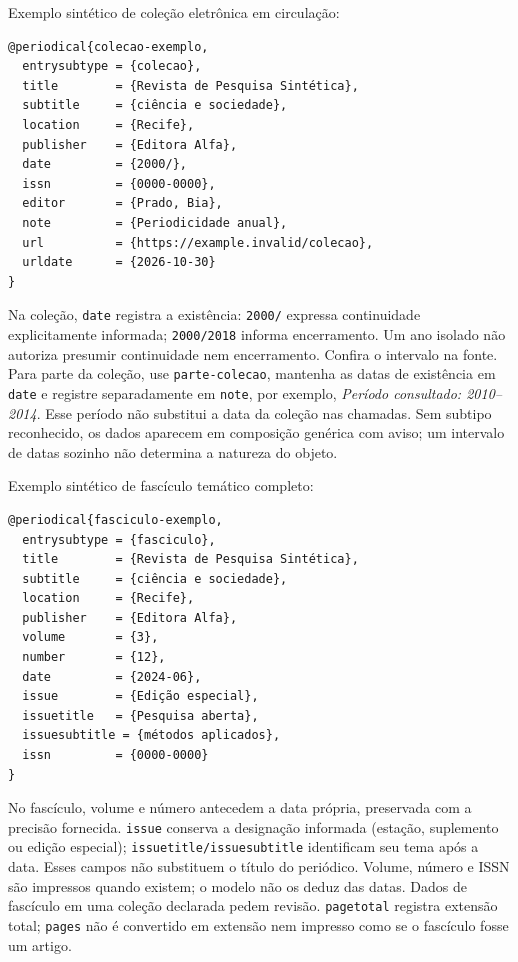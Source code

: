 \begin{samepage}
Exemplo sintético de coleção eletrônica em circulação:
\begin{verbatim}
@periodical{colecao-exemplo,
  entrysubtype = {colecao},
  title        = {Revista de Pesquisa Sintética},
  subtitle     = {ciência e sociedade},
  location     = {Recife},
  publisher    = {Editora Alfa},
  date         = {2000/},
  issn         = {0000-0000},
  editor       = {Prado, Bia},
  note         = {Periodicidade anual},
  url          = {https://example.invalid/colecao},
  urldate      = {2026-10-30}
}
\end{verbatim}
\end{samepage}

Na coleção, \texttt{date} registra a existência: \texttt{2000/} expressa
continuidade explicitamente informada; \texttt{2000/2018} informa encerramento.
Um ano isolado não autoriza presumir continuidade nem encerramento. Confira
o intervalo na fonte. Para parte da coleção, use \texttt{parte-colecao}, mantenha
as datas de existência em \texttt{date} e registre separadamente em
\texttt{note}, por exemplo, \emph{Período consultado: 2010--2014}.
Esse período não substitui a data da coleção nas chamadas.
Sem subtipo reconhecido, os dados aparecem em composição genérica com aviso;
um intervalo de datas sozinho não determina a natureza do objeto.

\begin{samepage}
Exemplo sintético de fascículo temático completo:
\begin{verbatim}
@periodical{fasciculo-exemplo,
  entrysubtype = {fasciculo},
  title        = {Revista de Pesquisa Sintética},
  subtitle     = {ciência e sociedade},
  location     = {Recife},
  publisher    = {Editora Alfa},
  volume       = {3},
  number       = {12},
  date         = {2024-06},
  issue        = {Edição especial},
  issuetitle   = {Pesquisa aberta},
  issuesubtitle = {métodos aplicados},
  issn         = {0000-0000}
}
\end{verbatim}
\end{samepage}

No fascículo, volume e número antecedem a data própria, preservada com a
precisão fornecida. \texttt{issue} conserva a designação informada (estação,
suplemento ou edição especial); \texttt{issuetitle/issuesubtitle} identificam
seu tema após a data. Esses campos não substituem o título do periódico.
Volume, número e ISSN são impressos quando existem; o modelo não os deduz
das datas. Dados de fascículo em uma coleção declarada pedem revisão.
\texttt{pagetotal} registra extensão total; \texttt{pages} não é convertido em
extensão nem impresso como se o fascículo fosse um artigo.

